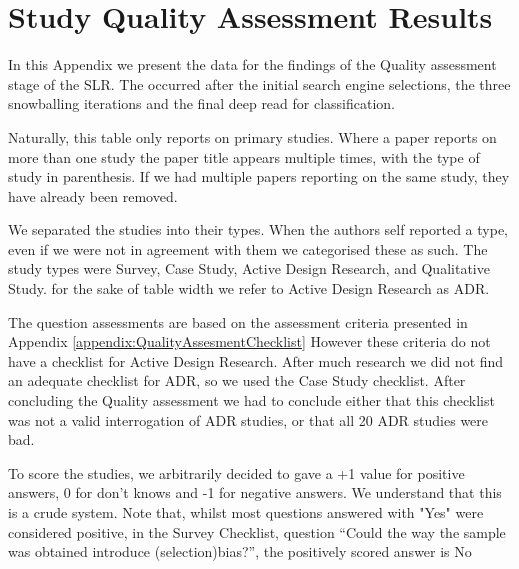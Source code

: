 \chapter{Study Quality Assessment Results} 
\label{appendix:Quality_Assessment_Results} 

In this Appendix we present the data for the findings of the Quality assessment stage of the SLR.
The occurred after the initial search engine selections, the three snowballing iterations and the final deep read for classification.

Naturally, this table only reports on primary studies.
Where a paper reports on more than one study the paper title appears multiple times, with the type of study in parenthesis.
If we had multiple papers reporting on the same study, they have already been removed.

We separated the studies into their types. 
When the authors self reported a type, even if we were not in agreement with them we categorised these as such.
The study types were Survey, Case Study, Active Design Research, and Qualitative Study.
for the sake of table width we refer to Active Design Research as ADR.

The question assessments are based on the assessment criteria presented in Appendix \ref{appendix:QualityAssesmentChecklist}
However these criteria do not have a checklist for Active Design Research.
After much research we did not find an adequate checklist for ADR, so we used the Case Study checklist.
After concluding the Quality assessment we had to conclude either that this checklist was not a valid interrogation of ADR studies, or that all 20 ADR studies were bad.

To score the studies, we arbitrarily decided to gave a +1 value for positive answers, 0 for don't knows and -1 for negative answers.
We understand that this is a crude system.
Note that, whilst most questions answered with "Yes" were considered positive, in the Survey Checklist, question ``Could the way the sample was obtained introduce (selection)bias?'', the positively scored answer is No

